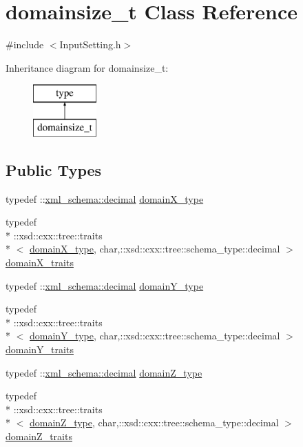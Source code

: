 \hypertarget{classdomainsize__t}{\section{domainsize\-\_\-t Class Reference}
\label{classdomainsize__t}
}


{\ttfamily \#include $<$Input\-Setting.\-h$>$}

Inheritance diagram for domainsize\-\_\-t\-:\begin{figure}[H]
\begin{center}
\leavevmode
\includegraphics[height=2.000000cm]{classdomainsize__t}
\end{center}
\end{figure}
\subsection*{Public Types}
\begin{DoxyCompactItemize}
\item 
typedef \-::\hyperlink{namespacexml__schema_a69bfaf24f63a8c18ebd8e21db6b343df}{xml\-\_\-schema\-::decimal} \hyperlink{classdomainsize__t_a854a03c90869763fcf75511fadb5caef}{domain\-X\-\_\-type}
\item 
typedef \\*
\-::xsd\-::cxx\-::tree\-::traits\\*
$<$ \hyperlink{classdomainsize__t_a854a03c90869763fcf75511fadb5caef}{domain\-X\-\_\-type}, char,\-::xsd\-::cxx\-::tree\-::schema\-\_\-type\-::decimal $>$ \hyperlink{classdomainsize__t_ab85fcf810949f1a467f81f0f7f443eb4}{domain\-X\-\_\-traits}
\item 
typedef \-::\hyperlink{namespacexml__schema_a69bfaf24f63a8c18ebd8e21db6b343df}{xml\-\_\-schema\-::decimal} \hyperlink{classdomainsize__t_a668c8a71e21505b0ad029fa62f996085}{domain\-Y\-\_\-type}
\item 
typedef \\*
\-::xsd\-::cxx\-::tree\-::traits\\*
$<$ \hyperlink{classdomainsize__t_a668c8a71e21505b0ad029fa62f996085}{domain\-Y\-\_\-type}, char,\-::xsd\-::cxx\-::tree\-::schema\-\_\-type\-::decimal $>$ \hyperlink{classdomainsize__t_a4a4de85f17a3ad6f88f1ee94df83eba5}{domain\-Y\-\_\-traits}
\item 
typedef \-::\hyperlink{namespacexml__schema_a69bfaf24f63a8c18ebd8e21db6b343df}{xml\-\_\-schema\-::decimal} \hyperlink{classdomainsize__t_ab33974c39e210e214cc02d863326cf5c}{domain\-Z\-\_\-type}
\item 
typedef \\*
\-::xsd\-::cxx\-::tree\-::traits\\*
$<$ \hyperlink{classdomainsize__t_ab33974c39e210e214cc02d863326cf5c}{domain\-Z\-\_\-type}, char,\-::xsd\-::cxx\-::tree\-::schema\-\_\-type\-::decimal $>$ \hyperlink{classdomainsize__t_aaa8ff3c9add78b2aa36254ba82bf137e}{domain\-Z\-\_\-traits}
\end{DoxyCompactItemize}

